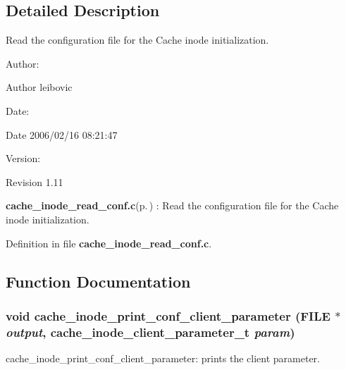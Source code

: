\subsection{Detailed Description}
Read the configuration file for the Cache inode initialization. 

\begin{Desc}
\item[Author:]\begin{Desc}
\item[Author]leibovic \end{Desc}
\end{Desc}
\begin{Desc}
\item[Date:]\begin{Desc}
\item[Date]2006/02/16 08:21:47 \end{Desc}
\end{Desc}
\begin{Desc}
\item[Version:]\begin{Desc}
\item[Revision]1.11 \end{Desc}
\end{Desc}
{\bf cache\_\-inode\_\-read\_\-conf.c}{\rm (p.\,\pageref{cache__inode__read__conf_8c})} : Read the configuration file for the Cache inode initialization.

Definition in file {\bf cache\_\-inode\_\-read\_\-conf.c}.

\subsection{Function Documentation}
\subsubsection{\setlength{\rightskip}{0pt plus 5cm}void cache\_\-inode\_\-print\_\-conf\_\-client\_\-parameter (FILE $\ast$ {\em output}, cache\_\-inode\_\-client\_\-parameter\_\-t {\em param})}\label{cache__inode__read__conf_8c_a4}


cache\_\-inode\_\-print\_\-conf\_\-client\_\-parameter: prints the client parameter.


